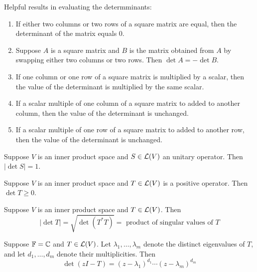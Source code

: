 \documentclass{extarticle}
\begin{document}
\begin{corollary}
    Helpful results in evaluating the determminants: 

    \begin{enumerate}[label=(\alph*)]
        \item If either two columns or two rows of a square matrix are equal, then the determinant of the 
        matrix equals 0. 
        \item Suppose \(A\) is a square matrix and \(B\) is the matrix obtained from \(A\) by swapping either 
        two columns or two rows. Then \(\det A = - \det B\).
        \item If one column or one row of a square matrix is multiplied by a scalar, then the value of the 
        determinant is multiplied by the same scalar. 
        \item If a scalar multiple of one column of a square matrix to added to another column, then the value 
        of the determinant is unchanged. 
        \item If a scalar multiple of one row of a square matrix to added to another row, then the value of 
        the determinant is unchanged. 
    \end{enumerate}
\end{corollary}


\begin{corollary}
    Suppose \(V\) is an inner product space and \(S \in \mathcal{L}(V)\) an unitary operator. Then 
    \(|\det S| = 1\).
\end{corollary}


\begin{corollary}
    Suppose \(V\) is an inner product space and \(T \in \mathcal{L}(V)\) is a positive operator. Then 
    \(\det T \geq 0\).
\end{corollary}

\begin{corollary}
    Suppose \(V\) is an inner product space and \(T \in \mathcal{L}(V)\). Then 
    \[|\det T| = \sqrt{\det (T^* T)} = \text{ product of singular values of } T\]
\end{corollary}


\begin{lemma}
    Suppose \(\mathbb{F} = \mathbb{C}\) and \(T \in \mathcal{L}(V)\). Let \(\lambda_1, \ldots, \lambda_m\) denote the distinct 
    eigenvalues of \(T\), and let \(d_1, \ldots, d_m\) denote their multiplicities. Then 
    \[\det (zI - T) = (z - \lambda_1)^{d_1} \cdots (z - \lambda_m)^{d_m}\]
\end{lemma}
\end{document}
